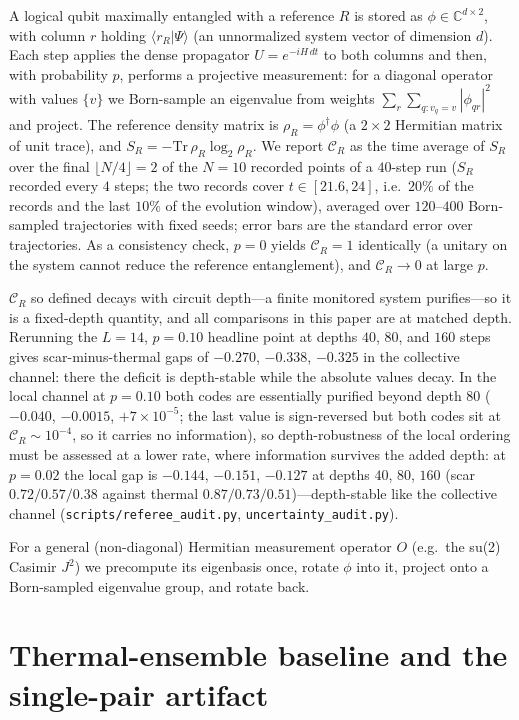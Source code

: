 \documentclass[aps,prb,twocolumn]{revtex4-2}
\newcommand{\CR}{\mathcal{C}_R}
\begin{document}
A logical qubit maximally entangled with a reference $R$ is stored as
$\phi\in\mathbb{C}^{d\times2}$, with column $r$ holding $\langle r_R|\Psi\rangle$
(an unnormalized system vector of dimension $d$). Each step applies the dense
propagator $U=e^{-iH\,dt}$ to both columns and then, with probability $p$,
performs a projective measurement: for a diagonal operator with values $\{v\}$ we
Born-sample an eigenvalue from weights $\sum_r\sum_{q:v_q=v}|\phi_{qr}|^2$ and
project. The reference density matrix is $\rho_R=\phi^\dagger\phi$ (a $2\times2$
Hermitian matrix of unit trace), and $S_R=-\mathrm{Tr}\,\rho_R\log_2\rho_R$. We
report $\CR$ as the time average of $S_R$ over the final
$\lfloor N/4\rfloor=2$ of the $N=10$ recorded points of a $40$-step run
($S_R$ recorded every $4$ steps; the two records cover $t\in[21.6,24]$,
i.e.\ $20\%$ of the records and the last $10\%$ of the evolution window),
averaged over $120$--$400$ Born-sampled trajectories with
fixed seeds; error bars are the standard error over trajectories. As a
consistency check, $p=0$ yields $\CR=1$ identically (a unitary on the system
cannot reduce the reference entanglement), and $\CR\to0$ at large $p$.

$\CR$ so defined decays with circuit depth---a finite monitored system
purifies---so it is a fixed-depth quantity, and all comparisons in this paper
are at matched depth. Rerunning the
$L{=}14$, $p{=}0.10$ headline point at depths $40$, $80$, and $160$ steps
gives scar-minus-thermal gaps of $-0.270$, $-0.338$,
$-0.325$ in the collective channel: there the deficit is depth-stable while
the absolute values decay. In the local channel at $p=0.10$ both codes are
essentially purified beyond depth $80$ ($-0.040$, $-0.0015$, $+7\times
10^{-5}$; the last value is sign-reversed but both codes sit at
$\CR\sim10^{-4}$, so it carries no information), so
depth-robustness of the local ordering must be assessed at a lower rate,
where information survives the added depth: at $p=0.02$ the local gap is
$-0.144$, $-0.151$, $-0.127$ at depths $40$, $80$, $160$ (scar
$0.72/0.57/0.38$ against thermal $0.87/0.73/0.51$)---depth-stable like the
collective channel
(\texttt{scripts/referee\_audit.py}, \texttt{uncertainty\_audit.py}).

For a general (non-diagonal) Hermitian measurement operator $O$ (e.g.\ the su(2)
Casimir $J^2$) we precompute its eigenbasis once, rotate $\phi$ into it, project
onto a Born-sampled eigenvalue group, and rotate back.

\section{Thermal-ensemble baseline and the single-pair artifact}
\label{app:ensemble}
\end{document}
